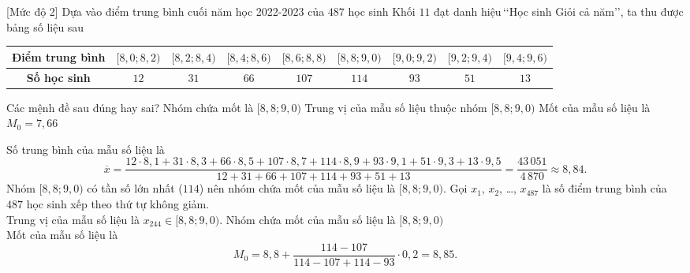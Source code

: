 \begin{ex}%
[Mức độ 2]%
	Dựa vào điểm trung bình cuối năm học 2022-2023 của $487$ học sinh Khối $11$ đạt danh hiệu\,\lq\lq Học sinh Giỏi cả năm\rq\rq, ta thu được bảng số liệu sau
	\begin{center}
		\begin{tabular}{|c|c|c|c|c|c|c|c|c|}
			\hline
			\textbf{Điểm trung bình}& $[8{,}0;8{,}2)$ & $[8{,}2;8{,}4)$ & $[8{,}4;8{,}6)$ & $[8{,}6;8{,}8)$ & $[8{,}8;9{,}0)$ & $[9{,}0;9{,}2)$ & $[9{,}2;9{,}4)$ & $[9{,}4;9{,}6)$\\
			\hline
			\textbf{Số học sinh}	& $12$ & $31$ & $66$ & $107$ & $114$ & $93$ & $51$ & $13$ \\
			\hline
		\end{tabular}
	\end{center}
	Các mệnh đề sau đúng hay sai?
	{\True Nhóm chứa mốt là $[8{,}8;9{,}0)$}
	{\True Trung vị của mẫu số liệu thuộc nhóm $[8{,}8;9{,}0)$}
	{Mốt của mẫu số liệu là $M_0=7{,}66$}
	\loigiai 
	{\begin{itemchoice}
			\itemch 
			Số trung bình của mẫu số liệu là
			\[\overline{x}=\dfrac{12\cdot8{,}1+31\cdot8{,}3+66\cdot8{,}5+107\cdot8{,}7+114\cdot8{,}9+93\cdot9{,}1+51\cdot9{,}3+13\cdot9{,}5}{12+31+66+107+114+93+51+13}=\dfrac{43\,051}{4\,870}\approx8{,}84.\]
			\itemch 
			Nhóm $[8{,}8;9{,}0)$ có tần số lớn nhất ($114$) nên nhóm chứa mốt của mẫu số liệu là $[8{,}8;9{,}0)$.
			\itemch 
			Gọi $x_1$, $x_2$, \ldots, $x_{487}$ là số điểm trung bình của $487$ học sinh xếp theo thứ tự không giảm.\\
			Trung vị của mẫu số liệu là $x_{244}\in[8{,}8;9{,}0)$.
			\itemch 
			Nhóm chứa mốt của mẫu số liệu là $[8{,}8;9{,}0)$\\
			Mốt của mẫu số liệu là
			\[M_0=8{,}8+\dfrac{114-107}{114-107+114-93}\cdot 0{,}2=8{,}85.\]
		\end{itemchoice}}
\end{ex}

